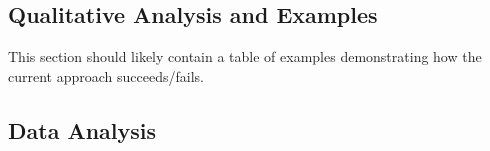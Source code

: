\documentclass[11pt,a4paper]{article}
\begin{document}
\subsection{Qualitative Analysis and Examples}
This section should likely contain a table of examples demonstrating how the current approach succeeds/fails.




\clearpage

\begin{appendices}
\section{Data Analysis}
\label{appendix:A}


\end{appendices}
\end{document}

